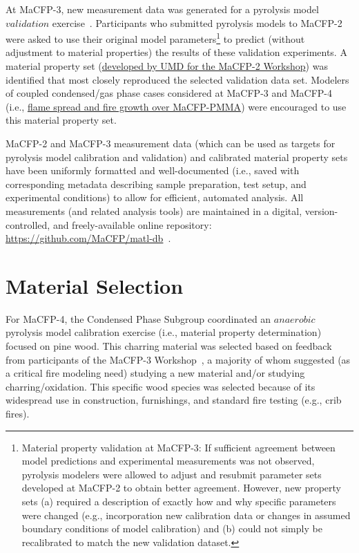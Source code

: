 \documentclass{book}
\begin{document}
At MaCFP-3, new measurement data was generated for a pyrolysis model $validation$ exercise~\cite{MaCFP3Proceedings, Leventon2023Gasification}. Participants who submitted pyrolysis models to MaCFP-2 were asked to use their original model parameters\footnote{Material property validation at MaCFP-3: If sufficient agreement between model predictions and experimental measurements was not observed, pyrolysis modelers were allowed to adjust and resubmit parameter sets developed at MaCFP-2 to obtain better agreement. However, new property sets (a) required a description of exactly how and why specific parameters were changed (e.g., incorporation new calibration data or changes in assumed boundary conditions of model calibration) and (b) could not simply be recalibrated  to match the new validation dataset.} to predict (without adjustment to material properties) the results of these validation experiments. A material property set (\href{https://github.com/MaCFP/matl-db/blob/master/PMMA/Material_Properties/2021/MaCFP_PMMA_UMD.json}{developed by UMD for the MaCFP-2 Workshop}) was identified that most closely reproduced the selected validation data set. Modelers of coupled condensed/gas phase cases considered at MaCFP-3 and MaCFP-4 (i.e., \href{https://github.com/MaCFP/macfp-db/tree/master/Fire_Growth}{flame spread and fire growth over MaCFP-PMMA}) were encouraged to use this material property set.

MaCFP-2 and MaCFP-3 measurement data (which can be used as targets for pyrolysis model calibration and validation) and calibrated material property sets have been uniformly formatted and well-documented (i.e., saved with corresponding metadata describing sample preparation, test setup, and experimental conditions) to allow for efficient, automated analysis. All measurements (and related analysis tools) are maintained in a digital, version-controlled, and freely-available online repository: \url{https://github.com/MaCFP/matl-db}~\cite{MaCFP-cond-db}.
\section{Material Selection}
For MaCFP-4, the Condensed Phase Subgroup coordinated an $anaerobic$ pyrolysis model calibration exercise (i.e., material property determination) focused on pine wood. This charring material was selected based on feedback from participants of the MaCFP-3 Workshop~\cite{MaCFP3Proceedings}, a majority of whom suggested (as a critical fire modeling need) studying a new material and/or studying charring/oxidation. This specific wood species was selected because of its widespread use in construction, furnishings, and standard fire testing (e.g., crib fires).
\end{document}
